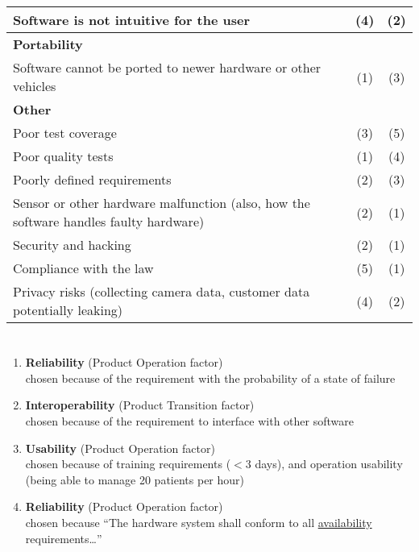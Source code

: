 \documentclass[letterpaper]{article}
\begin{document}
\begin{table}[H]
\begin{tabularx}{\textwidth}{X|c|c|}
		Software is not intuitive for the user                                                & (4)            & (2)           \\ \hline
		\textbf{Portability}                                                                  &                &               \\ \hline
		Software cannot be ported to newer hardware or other vehicles                         & (1)            & (3)           \\ \hline
		\textbf{Other}                                                                        &                &               \\ \hline
		Poor test coverage                                                                    & (3)            & (5)           \\ \hline
		Poor quality tests                                                                    & (1)            & (4)           \\ \hline
		Poorly defined requirements                                                           & (2)            & (3)           \\ \hline
		Sensor or other hardware malfunction (also, how the software handles faulty hardware) & (2)            & (1)           \\ \hline
		Security and hacking                                                                  & (2)            & (1)           \\ \hline
		Compliance with the law                                                               & (5)            & (1)           \\ \hline
		Privacy risks (collecting camera data, customer data potentially leaking)             & (4)            & (2)           \\ \hline
	\end{tabularx}
\end{table}

\section{}

\begin{enumerate}
	\item \textbf{Reliability} (Product Operation factor) \\
	chosen because of the requirement with the probability of a state of failure
	\item \textbf{Interoperability} (Product Transition factor) \\
		chosen because of the requirement to interface with other software
	\item \textbf{Usability} (Product Operation factor) \\
		chosen because of training requirements ($<3$ days), and operation usability (being able to manage 20 patients per hour)
	\item \textbf{Reliability} (Product Operation factor) \\
		chosen because ``The hardware system shall conform to all \underline{availability} requirements\dots''
\end{enumerate}
\end{document}
